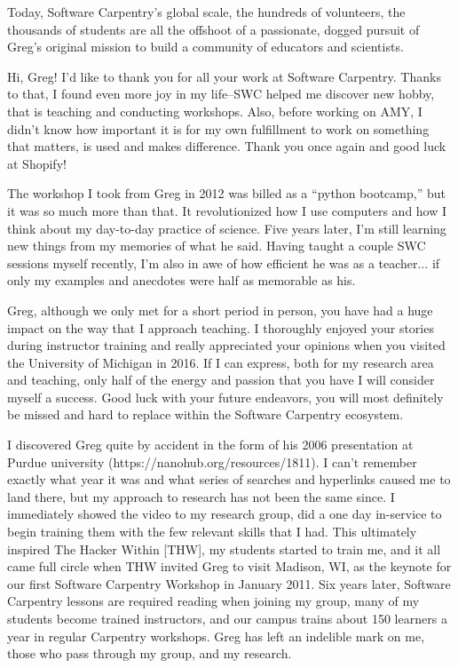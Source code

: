 Today, Software Carpentry's global scale, the hundreds of volunteers, the
thousands of students are all the offshoot of a passionate, dogged pursuit of
Greg's original mission to build a community of educators and scientists.


\newpage

Hi, Greg! I'd like to thank you for all your work at Software Carpentry. Thanks
to that, I found even more joy in my life--SWC helped me discover new hobby,
that is teaching and conducting workshops. Also, before working on AMY, I
didn't know how important it is for my own fulfillment to work on something
that matters, is used and makes difference. Thank you once again and good luck
at Shopify!


\newpage

The workshop I took from Greg in 2012 was billed as a ``python bootcamp,'' but
it was so much more than that.  It revolutionized how I use computers and how I
think about my day-to-day practice of science.  Five years later, I'm still
learning new things from my memories of what he said.  Having taught a couple
SWC sessions myself recently, I'm also in awe of how efficient he was as a
teacher...  if only my examples and anecdotes were half as memorable as his.


\newpage

Greg, although we only met for a short period in person, you have had a huge
impact on the way that I approach teaching.  I thoroughly enjoyed your stories
during instructor training and really appreciated your opinions when you
visited the University of Michigan in 2016.  If I can express, both for my
research area and teaching, only half of the energy and passion that you have I
will consider myself a success.  Good luck with your future endeavors, you will
most definitely be missed and hard to replace within the Software Carpentry
ecosystem.     


\newpage

I discovered Greg quite by accident in the form of his 2006 presentation at
Purdue university (https://nanohub.org/resources/1811).  I can't remember
exactly what year it was and what series of searches and hyperlinks caused me
to land there, but my approach to research has not been the same since.  I
immediately showed the video to my research group, did a one day in-service to
begin training them with the few relevant skills that I had.  This ultimately
inspired The Hacker Within [THW], my students started to train me, and it all
came full circle when THW invited Greg to visit Madison, WI, as the keynote for
our first Software Carpentry Workshop in January 2011. Six years later,
Software Carpentry lessons are required reading when joining my group, many of
my students become trained instructors, and our campus trains about 150
learners a year in regular Carpentry workshops.  Greg has left an indelible
mark on me, those who pass through my group, and my research.


